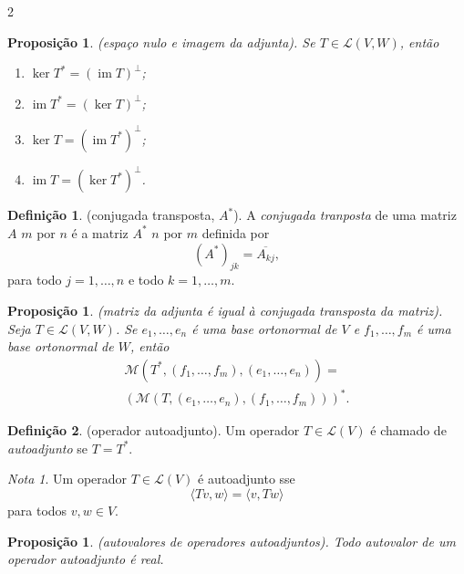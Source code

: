 \documentclass{article}
\theoremstyle{plain}
\newtheorem{prop}[thm]{Proposição}
\theoremstyle{definition}
\newtheorem{defn}{Definição}[section]
\theoremstyle{remark}
\newtheorem*{rem}{Nota}
\DeclareMathOperator{\im}{im}
\begin{document}
\begin{multicols}{2}
\begin{prop} (espaço nulo e imagem da adjunta).
    Se \(T \in \mathcal{L}(V, W)\), então
    \begin{enumerate}
        \item [\textup{(a)}] \(\ker T^* = (\im T)^\perp\);
        \item [\textup{(b)}] \(\im T^* = (\ker T)^\perp\);
        \item [\textup{(c)}] \(\ker T = (\im T^*)^\perp\);
        \item [\textup{(d)}] \(\im T = (\ker T^*)^\perp\).
    \end{enumerate}
\end{prop}

\begin{defn} (conjugada transposta, \(A^*\)).
    A \emph{conjugada tranposta} de uma matriz \(A\) \(m\) por \(n\) é a matriz \(A^*\) \(n\) por \(m\) definida por
    \[
        (A^*)_{jk} = \overline{A_{kj}},
    \]
    \noindent para todo \(j = 1, \ldots, n\) e todo \(k = 1, \ldots, m\).
\end{defn}

\begin{prop} (matriz da adjunta é igual à conjugada transposta da matriz).
    Seja \(T \in \mathcal{L}(V, W)\). Se \(e_1, \ldots, e_n\) é uma base ortonormal de \(V\) e \(f_1, \ldots, f_m\) é uma base ortonormal de \(W\), então
    \begin{gather}
        \mathcal{M}(T^*, (f_1, \ldots, f_m), (e_1, \ldots, e_n)) =\\
        (\mathcal{M}(T, (e_1, \ldots, e_n), (f_1, \ldots, f_m)))^*.
    \end{gather}
\end{prop}

\begin{defn} (operador autoadjunto).
    Um operador \(T \in \mathcal{L}(V)\) é chamado de \emph{autoadjunto} se \(T = T^*\).
\end{defn}

\begin{rem}
    Um operador \(T \in \mathcal{L}(V)\) é autoadjunto sse
    \[
        \langle Tv, w \rangle = \langle v, Tw \rangle
    \]
    \noindent para todos \(v, w \in V\).
\end{rem}

\begin{prop} (autovalores de operadores autoadjuntos).
    Todo autovalor de um operador autoadjunto é real.
\end{prop}


\end{multicols}
\end{document}
